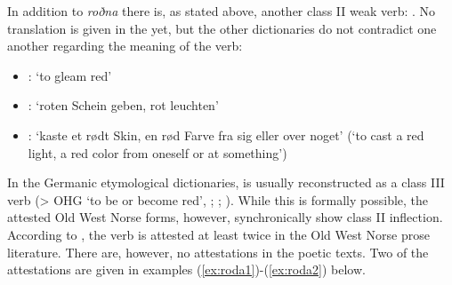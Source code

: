\documentclass[output=paper,colorlinks,citecolor=brown]{langscibook}
\begin{document}
In addition to \textit{roðna} there is, as stated above, another class II weak verb: . No translation is given in the  yet, but the other dictionaries do not contradict one another regarding the meaning of the verb:

\begin{itemize}
\item {}: ‘to gleam red’
\item {}: ‘roten Schein geben, rot leuchten’
\item {}: ‘kaste et rødt Skin, en rød Farve fra sig eller over noget’ (‘to cast a red light, a red color from oneself or at something’)
\end{itemize}

In the Germanic etymological dictionaries,  is usually reconstructed as a class III verb  (> OHG  ‘to be or become red’, ; ; ). While this is formally possible, the attested Old West Norse forms, however, synchronically show class II inflection. According to , the verb is attested at least twice in the Old West Norse prose literature. There are, however, no attestations in the poetic texts. Two of the attestations are given in examples (\ref{ex:roda1})-(\ref{ex:roda2}) below.
\end{document}
